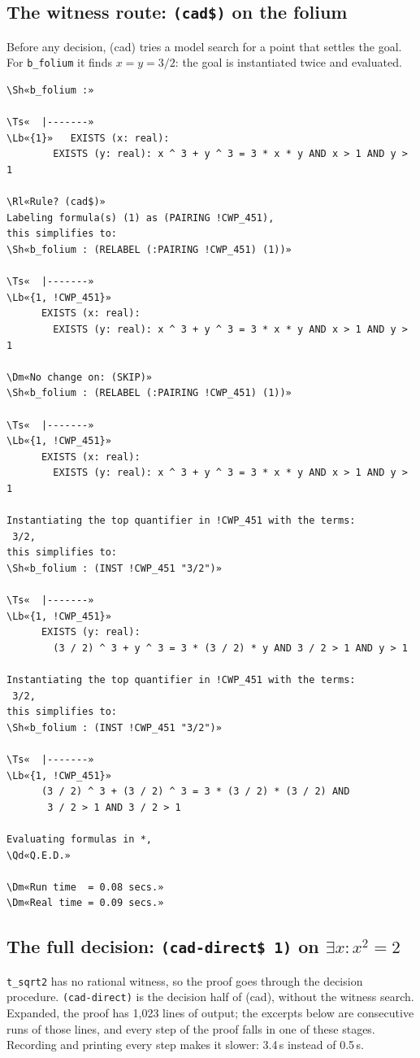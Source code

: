\documentclass[11pt]{article}
\newcommand\Rl[1]{\textcolor{accent}{\textbf{#1}}}
\newcommand\Qd[1]{\colorbox{mosssoft}{\textcolor{moss}{\textbf{#1}}}}
\newcommand\Dm[1]{\textcolor{muted}{#1}}
\newcommand\Lb[1]{\textcolor{muted}{#1}}
\newcommand\Ts[1]{\textcolor{muted}{#1}}
\newcommand\Sh[1]{\textcolor{accent}{#1}}
\begin{document}
\subsection*{The witness route: \texttt{(cad\$)} on the folium}
Before any decision, (cad) tries a model search for a point that settles the goal. For \texttt{b\_folium} it
finds $x = y = 3/2$: the goal is instantiated twice and evaluated.
\begin{termbox}
\begin{Verbatim}[commandchars=\\«»]
\Sh«b_folium :»

\Ts«  |-------»
\Lb«{1}»   EXISTS (x: real):
        EXISTS (y: real): x ^ 3 + y ^ 3 = 3 * x * y AND x > 1 AND y > 1

\Rl«Rule? (cad$)»
Labeling formula(s) (1) as (PAIRING !CWP_451),
this simplifies to:
\Sh«b_folium : (RELABEL (:PAIRING !CWP_451) (1))»

\Ts«  |-------»
\Lb«{1, !CWP_451}»
      EXISTS (x: real):
        EXISTS (y: real): x ^ 3 + y ^ 3 = 3 * x * y AND x > 1 AND y > 1

\Dm«No change on: (SKIP)»
\Sh«b_folium : (RELABEL (:PAIRING !CWP_451) (1))»

\Ts«  |-------»
\Lb«{1, !CWP_451}»
      EXISTS (x: real):
        EXISTS (y: real): x ^ 3 + y ^ 3 = 3 * x * y AND x > 1 AND y > 1

Instantiating the top quantifier in !CWP_451 with the terms:
 3/2,
this simplifies to:
\Sh«b_folium : (INST !CWP_451 "3/2")»

\Ts«  |-------»
\Lb«{1, !CWP_451}»
      EXISTS (y: real):
        (3 / 2) ^ 3 + y ^ 3 = 3 * (3 / 2) * y AND 3 / 2 > 1 AND y > 1

Instantiating the top quantifier in !CWP_451 with the terms:
 3/2,
this simplifies to:
\Sh«b_folium : (INST !CWP_451 "3/2")»

\Ts«  |-------»
\Lb«{1, !CWP_451}»
      (3 / 2) ^ 3 + (3 / 2) ^ 3 = 3 * (3 / 2) * (3 / 2) AND
       3 / 2 > 1 AND 3 / 2 > 1

Evaluating formulas in *,
\Qd«Q.E.D.»

\Dm«Run time  = 0.08 secs.»
\Dm«Real time = 0.09 secs.»
\end{Verbatim}
\end{termbox}

\subsection*{The full decision: \texttt{(cad-direct\$ 1)} on $\exists x\colon x^2 = 2$}
\texttt{t\_sqrt2} has no rational witness, so the proof goes through the decision procedure. \texttt{(cad-direct)} is the
decision half of (cad), without the witness search. Expanded, the proof has 1,023 lines of output; the excerpts below are
consecutive runs of those lines, and every step of the proof falls in one of these stages.
Recording and printing every step makes it slower: 3.4\,s instead of 0.5\,s.
\end{document}

